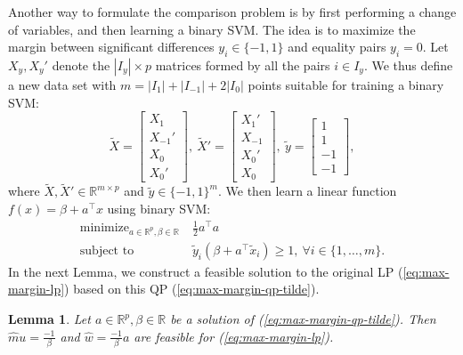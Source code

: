 \documentclass{article}
\newtheorem{lemma}{Lemma}
\newcommand{\RR}{\mathbb R}
\DeclareMathOperator*{\minimize}{minimize}
\begin{document}
Another way to formulate the comparison problem is by first performing
a change of variables, and then learning a binary SVM. The idea is to
maximize the margin between significant differences $y_i\in\{-1,1\}$
and equality pairs $y_i=0$. Let $X_y,X_y'$ denote the $|I_y|\times p$
matrices formed by all the pairs $i\in I_y$. We thus define a new data
set with $m=|I_1|+|I_{-1}|+2|I_0|$ points suitable for training a
binary SVM:
\begin{equation}
  \tilde X = \left[
    \begin{array}{c}
      X_1 \\
      X_{-1}'\\
      X_0\\
      X_0'
    \end{array}
  \right],\ 
  \tilde X' = \left[
    \begin{array}{c}
      X_1' \\
      X_{-1}\\
      X_0'\\
      X_0
    \end{array}
  \right],\ 
  \tilde y = \left[
    \begin{array}{c}
      1 \\
      1\\
      -1\\
      -1
    \end{array}
  \right],
\end{equation}
where $\tilde X,\tilde X'\in\RR^{m\times p}$ and $\tilde
y\in\{-1,1\}^m$. We then learn a linear function
$f(x)=\beta+a^\intercal x$ using binary SVM:
\begin{equation}
  \label{eq:max-margin-qp-tilde}
  \begin{aligned}
    \minimize_{a\in\RR^p, \beta\in\RR}\ & \frac 1 2 a^\intercal a  \\
    \text{subject to}\ & \tilde y_i (\beta + a^\intercal \tilde x_i) \geq 1,
    \ \forall i\in\{1,\dots,m\}.
  \end{aligned}
\end{equation}
In the next Lemma, we construct a feasible solution to the original LP
(\ref{eq:max-margin-lp}) based on this QP
(\ref{eq:max-margin-qp-tilde}).
\begin{lemma}
  Let $a\in\RR^p,\beta\in\RR$ be a solution of
  (\ref{eq:max-margin-qp-tilde}). Then $\hat mu = \frac{-1}{\beta} $
  and $\hat w = \frac{-1}{\beta} a$ are feasible for
  (\ref{eq:max-margin-lp}).
\end{lemma}
\end{document}
